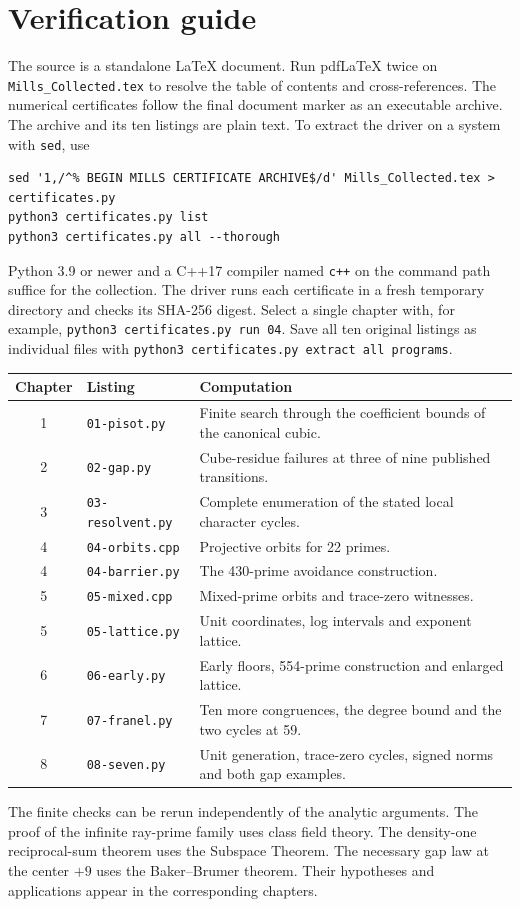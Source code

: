 \documentclass[11pt,a4paper,oneside,openany]{book}
\begin{document}
\chapter{Verification guide}
The source is a standalone LaTeX document. Run pdfLaTeX twice on \texttt{Mills\_Collected.tex} to resolve the table of contents and cross-references. The numerical certificates follow the final document marker as an executable archive. The archive and its ten listings are plain text. To extract the driver on a system with \texttt{sed}, use
\begin{Verbatim}[fontsize=\small,breaklines]
sed '1,/^% BEGIN MILLS CERTIFICATE ARCHIVE$/d' Mills_Collected.tex > certificates.py
python3 certificates.py list
python3 certificates.py all --thorough
\end{Verbatim}
Python 3.9 or newer and a C++17 compiler named \texttt{c++} on the command path suffice for the collection. The driver runs each certificate in a fresh temporary directory and checks its SHA-256 digest. Select a single chapter with, for example, \texttt{python3 certificates.py run 04}. Save all ten original listings as individual files with \texttt{python3 certificates.py extract all programs}.

\begin{center}\small\begin{tabular}{@{}clp{79mm}@{}}\toprule
Chapter & Listing & Computation\\\midrule
1 & \texttt{01-pisot.py} & Finite search through the coefficient bounds of the canonical cubic.\\[2pt]
2 & \texttt{02-gap.py} & Cube-residue failures at three of nine published transitions.\\[2pt]
3 & \texttt{03-resolvent.py} & Complete enumeration of the stated local character cycles.\\[2pt]
4 & \texttt{04-orbits.cpp} & Projective orbits for 22 primes.\\[2pt]
4 & \texttt{04-barrier.py} & The 430-prime avoidance construction.\\[2pt]
5 & \texttt{05-mixed.cpp} & Mixed-prime orbits and trace-zero witnesses.\\[2pt]
5 & \texttt{05-lattice.py} & Unit coordinates, log intervals and exponent lattice.\\[2pt]
6 & \texttt{06-early.py} & Early floors, 554-prime construction and enlarged lattice.\\[2pt]
7 & \texttt{07-franel.py} & Ten more congruences, the degree bound and the two cycles at 59.\\[2pt]
8 & \texttt{08-seven.py} & Unit generation, trace-zero cycles, signed norms and both gap examples.\\\bottomrule
\end{tabular}\end{center}
The finite checks can be rerun independently of the analytic arguments. The proof of the infinite ray-prime family uses class field theory. The density-one reciprocal-sum theorem uses the Subspace Theorem. The necessary gap law at the center $+9$ uses the Baker--Brumer theorem. Their hypotheses and applications appear in the corresponding chapters.
\end{document}
